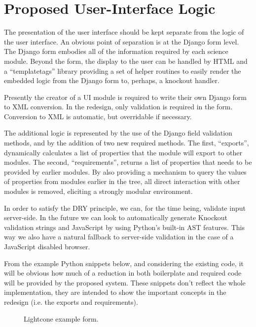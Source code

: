 \documentclass[12pt]{article}
\begin{document}
\section{Proposed User-Interface Logic}

The presentation of the user interface should be kept separate from the logic of the user
interface. An obvious point of separation is at the Django form level. The Django form embodies
all of the information required by each science module. Beyond the form, the display to the
user can be handled by HTML and a ``templatetags'' library providing a set of helper routines
to easily render the embedded logic from the Django form to, perhaps, a knockout handler.

Presently the creator of a UI module is required to write their own Django form to XML conversion.
In the redesign, only validation is required in the form. Conversion to XML is automatic, but
overridable if necessary.

The additional logic is represented by the use of the Django field validation methods, and by
the addition of two new required methods. The first, ``exports'', dynamically calculates a list
of properties that the module will export to other modules. The second, ``requirements'', returns
a list of properties that needs to be provided by earlier modules. By also providing a mechanism
to query the values of properties from modules earlier in the tree, all direct interaction with
other modules is removed, eliciting a strongly modular environment.

In order to satisfy the DRY principle, we can, for the time being, validate input server-side.
In the future we can look to automatically generate Knockout validation strings and JavaScript
by using Python's built-in AST features. This way we also have a natural fallback to server-side
validation in the case of a JavaScript disabled browser.

From the example Python snippets below, and considering the existing code, it will be obvious
how much of a reduction in both boilerplate and required code will be provided by the proposed
system. These snippets don't reflect the whole implementation, they are intended to show the
important concepts in the redesign (i.e. the exports and requirements).

\begin{figure}[H]

\caption{Lightcone example form.}
\end{figure}
\end{document}
